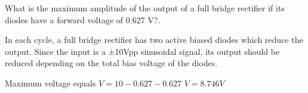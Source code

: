 	
		\question What is the maximum amplitude of the output of a full bridge rectifier if its diodes have a forward voltage of 0.627 V?.
		
		
		\begin{solution}
			In each cycle, a full bridge rectifier has two active biased diodes which reduce the output. Since the input is a ±10Vpp sinusoidal signal, its output should be reduced depending on the total bias voltage of the diodes.
			\begin{center}
			\end{center}
			
			Maximum voltage equals
			$V = 10-0.627-0.627$
			$V = 8.746 V$
		\end{solution}
	
		